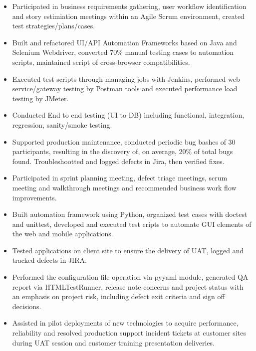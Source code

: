 \documentclass{resume}
\begin{document}
\begin{itemize}
  \item Participated in business requirements gathering, user workflow identification and story estimiation meetings within an Agile Scrum environment, created test strategies/plans/cases.
  \item Built and refactored UI/API Automation Frameworks based on Java and Selenium Webdriver, converted 70\% manual testing cases to automation scripts, maintained script of cross-browser compatibilities.
  \item Executed test scripts through managing jobs with Jenkins, performed web service/gateway testing by Postman tools and executed performance load testing by JMeter.
  \item Conducted End to end testing (UI to DB) including functional, integration, regression, sanity/smoke testing. 
  \item Supported production maintenance, conducted periodic bug bashes of 30 participants, resulting in the discovery of, on average, 20\% of total bugs found. Troubleshootted and logged defects in Jira, then verified fixes.
\end{itemize}

\begin{itemize}
  \item Participated in sprint planning meeting, defect triage meetings, scrum meeting and walkthrough meetings and recommended business work flow improvements.
  \item Built automation framework using Python, organized test cases with doctest and unittest, developed and executed test cripts to automate GUI elements of the web and mobile applications.
  \item Tested applications on client site to ensure the delivery of UAT, logged and tracked defects in JIRA.
  \item Performed the configuration file operation via pyyaml module, generated QA report via HTMLTestRunner, release note concerns and project status with an emphasis on project risk, including defect exit criteria and sign off decisions.
  \item Assisted in pilot deployments of new technologies to acquire performance, reliability and resolved production support incident tickets at customer sites during UAT session and customer training presentation deliveries.  
\end{itemize}
\end{document}
